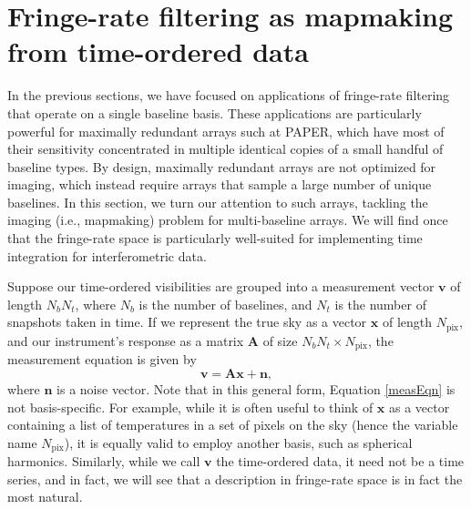 \documentclass[twocolumn,apj,numberedappendix]{emulateapj}
\newcommand{\vis}{\mathbf{v}}
\newcommand{\x}{\mathbf{x}}
\newcommand{\A}{\mathbf{A}}
\begin{document}



\section{Fringe-rate filtering as mapmaking from time-ordered data}
\label{sec:Mapmaking}

In the previous sections, we have focused on applications of fringe-rate filtering that operate on a single baseline basis. These applications are particularly powerful for maximally redundant arrays such at PAPER, which have most of their sensitivity concentrated in multiple identical copies of a small handful of baseline types. By design, maximally redundant arrays are not optimized for imaging, which instead require arrays that sample a large number of unique baselines. In this section, we turn our attention to such arrays, tackling the imaging (i.e., mapmaking) problem for multi-baseline arrays. We will find once that the fringe-rate space is particularly well-suited for implementing time integration for interferometric data.


Suppose our time-ordered visibilities are grouped into a measurement vector
$\vis$ of length $N_b N_t$, where $N_b$ is the number of baselines, and $N_t$
is the number of snapshots taken in time.  If we represent the true sky as a
vector $\x$ of length $N_\textrm{pix}$, and our instrument's response as a
matrix $\A$ of size $N_b N_t \times N_\textrm{pix}$, the measurement equation
is given by
\begin{equation}
\label{measEqn}
\vis = \A \x + \mathbf{n},
\end{equation}
where $\mathbf{n}$ is a noise vector.  Note that in this general form, Equation
\eqref{measEqn} is not basis-specific.  For example, while it is often useful
to think of $\x$ as a vector containing a list of temperatures in a set of
pixels on the sky (hence the variable name $N_\textrm{pix}$), it is equally
valid to employ another basis, such as spherical harmonics.  Similarly, while
we call $\vis$ the time-ordered data, it need not be a time series, and in
fact, we will see that a description in fringe-rate space is in fact the most natural.
\end{document}
